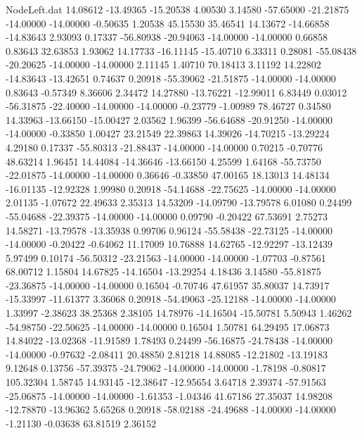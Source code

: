 \begin{filecontents}{NodeLeft.dat}
  14.08612  -13.49365  -15.20538     4.00530    3.14580  -57.65000  -21.21875  -14.00000  -14.00000   -0.50635    1.20538   45.15530   35.46541
  14.13672  -14.66858  -14.83643     2.93093    0.17337  -56.80938  -20.94063  -14.00000  -14.00000    0.66858    0.83643   32.63853    1.93062
  14.17733  -16.11145  -15.40710     6.33311    0.28081  -55.08438  -20.20625  -14.00000  -14.00000    2.11145    1.40710   70.18413    3.11192
  14.22802  -14.83643  -13.42651     0.74637    0.20918  -55.39062  -21.51875  -14.00000  -14.00000    0.83643   -0.57349    8.36606    2.34472
  14.27880  -13.76221  -12.99011     6.83449    0.03012  -56.31875  -22.40000  -14.00000  -14.00000   -0.23779   -1.00989   78.46727    0.34580
  14.33963  -13.66150  -15.00427     2.03562    1.96399  -56.64688  -20.91250  -14.00000  -14.00000   -0.33850    1.00427   23.21549   22.39863
  14.39026  -14.70215  -13.29224     4.29180    0.17337  -55.80313  -21.88437  -14.00000  -14.00000    0.70215   -0.70776   48.63214    1.96451
  14.44084  -14.36646  -13.66150     4.25599    1.64168  -55.73750  -22.01875  -14.00000  -14.00000    0.36646   -0.33850   47.00165   18.13013
  14.48134  -16.01135  -12.92328     1.99980    0.20918  -54.14688  -22.75625  -14.00000  -14.00000    2.01135   -1.07672   22.49633    2.35313
  14.53209  -14.09790  -13.79578     6.01080    0.24499  -55.04688  -22.39375  -14.00000  -14.00000    0.09790   -0.20422   67.53691    2.75273
  14.58271  -13.79578  -13.35938     0.99706    0.96124  -55.58438  -22.73125  -14.00000  -14.00000   -0.20422   -0.64062   11.17009   10.76888
  14.62765  -12.92297  -13.12439     5.97499    0.10174  -56.50312  -23.21563  -14.00000  -14.00000   -1.07703   -0.87561   68.00712    1.15804
  14.67825  -14.16504  -13.29254     4.18436    3.14580  -55.81875  -23.36875  -14.00000  -14.00000    0.16504   -0.70746   47.61957   35.80037
  14.73917  -15.33997  -11.61377     3.36068    0.20918  -54.49063  -25.12188  -14.00000  -14.00000    1.33997   -2.38623   38.25368    2.38105
  14.78976  -14.16504  -15.50781     5.50943    1.46262  -54.98750  -22.50625  -14.00000  -14.00000    0.16504    1.50781   64.29495   17.06873
  14.84022  -13.02368  -11.91589     1.78493    0.24499  -56.16875  -24.78438  -14.00000  -14.00000   -0.97632   -2.08411   20.48850    2.81218
  14.88085  -12.21802  -13.19183     9.12648    0.13756  -57.39375  -24.79062  -14.00000  -14.00000   -1.78198   -0.80817  105.32304    1.58745
  14.93145  -12.38647  -12.95654     3.64718    2.39374  -57.91563  -25.06875  -14.00000  -14.00000   -1.61353   -1.04346   41.67186   27.35037
  14.98208  -12.78870  -13.96362     5.65268    0.20918  -58.02188  -24.49688  -14.00000  -14.00000   -1.21130   -0.03638   63.81519    2.36152

\end{filecontents}
